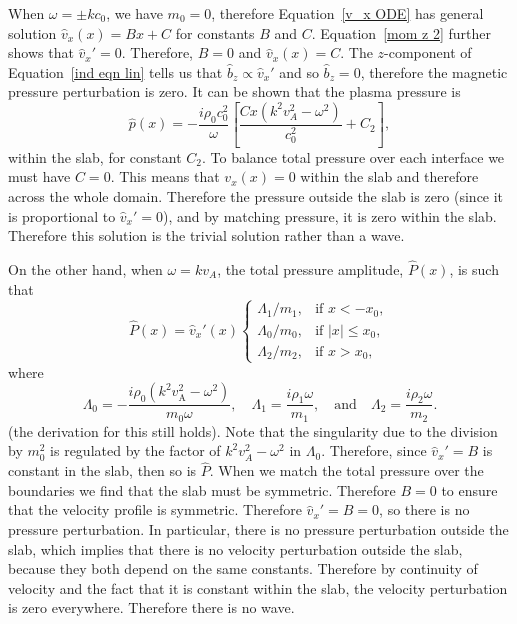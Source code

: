 When $\omega = \pm kc_0$, we have $m_0 = 0$, therefore Equation~\eqref{v_x ODE} has general solution $\widehat{v}_x(x) = Bx + C$ for constants $B$ and $C$. Equation~\eqref{mom z 2} further shows that  $\widehat{v}_x' = 0$. Therefore, $B = 0$ and $\widehat{v}_x(x) = C$. The $z$-component of Equation~\eqref{ind eqn lin} tells us that $\widehat{b}_z \propto \widehat{v}_x'$ and so $\widehat{b}_z = 0$, therefore the magnetic pressure perturbation is zero. It can be shown that the plasma pressure is
\begin{equation}
\widehat{p}(x) = - \frac{i\rho_0c_0^2}{\omega}\left[\frac{Cx(k^2v_A^2 - \omega^2)}{c_0^2} + C_2\right],
\end{equation}
within the slab, for constant $C_2$. To balance total pressure over each interface we must have $C = 0$. This means that $v_x(x) = 0$ within the slab and therefore across the whole domain. Therefore the pressure outside the slab is zero (since it is proportional to $\widehat{v}_x' = 0$), and by matching pressure, it is zero within the slab. Therefore this solution is the trivial solution rather than a wave.

On the other hand, when $\omega = kv_A$, the total pressure amplitude, $\widehat{P}(x)$, is such that
\begin{equation}
\widehat{P}(x)=\widehat{v}_x'(x)
\begin{cases}
\Lambda_1/m_1, & \text{if } x<-x_0, \\
\Lambda_0/m_0, & \text{if }|x|\leq{}x_0, \\
\Lambda_2/m_2, & \text{if }x>x_0,
\end{cases}
\end{equation}
where
\begin{equation}
\Lambda_0 = -\frac{i\rho_0(k^2v_\textrm{A}^2-\omega^2)}{m_0\omega}, \quad \Lambda_1=\frac{i\rho_1\omega}{m_1}, \quad \text{and} \quad \Lambda_2=\frac{i\rho_2\omega}{m_2}.
\end{equation}
(the derivation for this still holds). Note that the singularity due to the division by $m_0^2$ is regulated by the factor of $k^2v_A^2 - \omega^2$ in $\Lambda_0$. Therefore, since $\widehat{v}_x' = B$ is constant in the slab, then so is $\widehat{P}$. When we match the total pressure over the boundaries we find that the slab must be symmetric. Therefore $B=0$ to ensure that the velocity profile is symmetric. Therefore $\widehat{v}_x' = B = 0$, so there is no pressure perturbation. In particular, there is no pressure perturbation outside the slab, which implies that there is no velocity perturbation outside the slab, because they both depend on the same constants. Therefore by continuity of velocity and the fact that it is constant within the slab, the velocity perturbation is zero everywhere. Therefore there is no wave.


